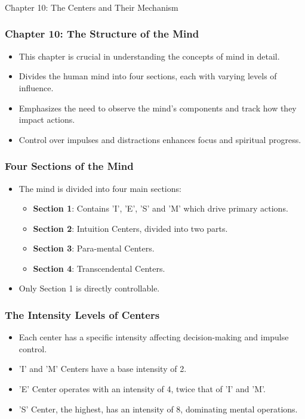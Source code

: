 \begin{frame}[fragile]\frametitle{}
\begin{center}
{\Large Chapter 10: The Centers and Their Mechanism }
\end{center}
\end{frame}

\begin{frame}[fragile]\frametitle{Chapter 10: The Structure of the Mind}
    \begin{itemize}
        \item This chapter is crucial in understanding the concepts of mind in detail.
        \item Divides the human mind into four sections, each with varying levels of influence.
        \item Emphasizes the need to observe the mind's components and track how they impact actions.
        \item Control over impulses and distractions enhances focus and spiritual progress.
    \end{itemize}
\end{frame}

\begin{frame}[fragile]\frametitle{Four Sections of the Mind}
    \begin{itemize}
        \item The mind is divided into four main sections:
        \begin{itemize}
            \item \textbf{Section 1}: Contains 'I', 'E', 'S' and 'M' which drive primary actions.
            \item \textbf{Section 2}: Intuition Centers, divided into two parts.
            \item \textbf{Section 3}: Para-mental Centers.
            \item \textbf{Section 4}: Transcendental Centers.
        \end{itemize}
        \item Only Section 1 is directly controllable.
    \end{itemize}
\end{frame}

\begin{frame}[fragile]\frametitle{The Intensity Levels of Centers}
    \begin{itemize}
        \item Each center has a specific intensity affecting decision-making and impulse control.
        \item 'I' and 'M' Centers have a base intensity of 2.
        \item 'E' Center operates with an intensity of 4, twice that of 'I' and 'M'.
        \item 'S' Center, the highest, has an intensity of 8, dominating mental operations.
    \end{itemize}
\end{frame}

